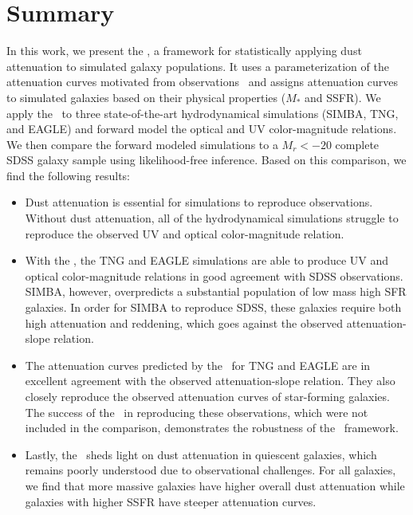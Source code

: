 \section{Summary}
In this work, we present the \eda, a framework for statistically applying dust
attenuation to simulated galaxy populations. It uses a parameterization of 
the attenuation curves motivated from observations~\citep{noll2009} and
assigns attenuation curves to simulated galaxies based on their physical properties ($M_*$ and SSFR).
We apply the \eda~to 
three state-of-the-art hydrodynamical simulations (SIMBA, TNG, and EAGLE) and
forward model the optical and UV color-magnitude relations. We then compare
the forward modeled simulations to a $M_r < -20$ complete SDSS galaxy sample  
using likelihood-free inference. Based on this comparison, we find the
following results: 

\begin{itemize}
    \item Dust attenuation is essential for simulations to reproduce observations.
        Without dust attenuation, all of the hydrodynamical simulations struggle
        to reproduce the observed UV and optical color-magnitude relation. 
    \item With the \eda, the TNG and EAGLE simulations are able to produce UV and
        optical color-magnitude relations in good agreement with SDSS observations. 
        SIMBA, however, overpredicts a substantial population of low mass high
        SFR galaxies. In order for SIMBA to reproduce SDSS, these galaxies require
        both high attenuation and reddening, which goes against the observed 
        attenuation-slope relation. 
    \item The attenuation curves predicted by the \eda~for TNG and EAGLE are in
        excellent agreement with the observed attenuation-slope
        relation. They also closely reproduce the observed attenuation curves
        of star-forming galaxies. The success of the \eda~in reproducing these
        observations, which were not included in the comparison, demonstrates
        the robustness of the \eda~framework. 
    \item Lastly, the \eda~sheds light on dust attenuation in quiescent
        galaxies, which remains poorly understood due to observational
        challenges. 
        For all galaxies, we find that more massive galaxies have higher overall dust
        attenuation while galaxies with higher SSFR have steeper attenuation
        curves. 
\end{itemize}

